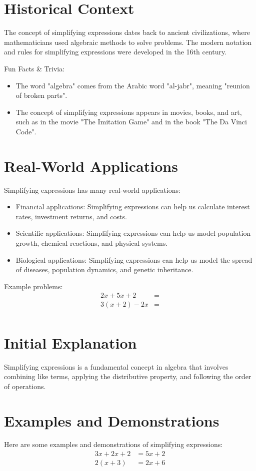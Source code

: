 \documentclass{article}
\begin{document}
\section{Historical Context}
The concept of simplifying expressions dates back to ancient civilizations, where mathematicians used algebraic methods to solve problems. The modern notation and rules for simplifying expressions were developed in the 16th century.

Fun Facts \& Trivia:
\begin{itemize}
\item The word "algebra" comes from the Arabic word "al-jabr", meaning "reunion of broken parts".
\item The concept of simplifying expressions appears in movies, books, and art, such as in the movie "The Imitation Game" and in the book "The Da Vinci Code".
\end{itemize}

\section{Real-World Applications}
Simplifying expressions has many real-world applications:
\begin{itemize}
\item Financial applications: Simplifying expressions can help us calculate interest rates, investment returns, and costs.
\item Scientific applications: Simplifying expressions can help us model population growth, chemical reactions, and physical systems.
\item Biological applications: Simplifying expressions can help us model the spread of diseases, population dynamics, and genetic inheritance.
\end{itemize}

Example problems:
\begin{align*}
2x + 5x + 2 &= \\
3(x + 2) - 2x &= \\
\end{align*}

\section{Initial Explanation}
Simplifying expressions is a fundamental concept in algebra that involves combining like terms, applying the distributive property, and following the order of operations.

\section{Examples and Demonstrations}
Here are some examples and demonstrations of simplifying expressions:
\begin{align*}
3x + 2x + 2 &= 5x + 2 \\
2(x + 3) &= 2x + 6 \\
\end{align*}
\end{document}

